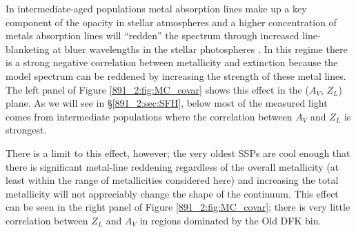 
In intermediate-aged populations metal absorption lines make up a key
component of the opacity in stellar atmospheres and a higher
concentration of metals absorption lines will ``redden'' the spectrum
through increased line-blanketing at bluer wavelengths in the stellar
photospheres \citep[see, e.g., Figure 4 in ][]{Vazdekis10}. In this
regime there is a strong negative correlation between metallicity and
extinction because the model spectrum can be reddened by increasing
the strength of these metal lines. The left panel of Figure
\ref{891_2:fig:MC_covar} shows this effect in the ($A_V$, $Z_L$)
plane. As we will see in \S\ref{891_2:sec:SFH}, below 
most of the measured light comes from intermediate populations where
the correlation between $A_V$ and $Z_L$ is strongest.

There is a limit to this effect, however; the very oldest SSPs are
cool enough that there is significant metal-line reddening regardless
of the overall metallicity (at least within the range of metallicities
considered here) and increasing the total metallicity will not
appreciably change the shape of the continuum. This effect can be seen
in the right panel of Figure \ref{891_2:fig:MC_covar}; there is very little
correlation between $Z_L$ and $A_V$ in regions dominated by the Old
DFK bin.


